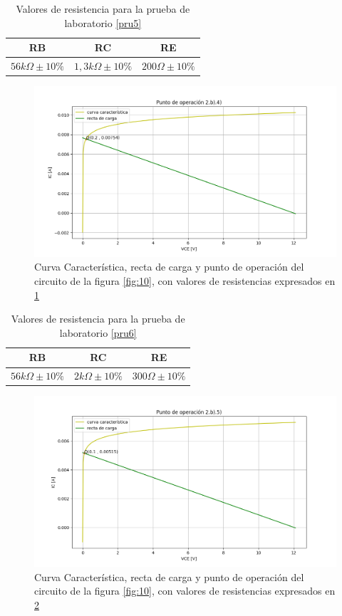 \documentclass[10pt, a4paper]{article}
\begin{document}
    \newpage

    \begin{table}[h!]
        \centering
        \caption{Valores de resistencia para la prueba de laboratorio \ref{pru5}}
        \label{tab:2b4}
        \begin{tabular}{|c|c|c|} \hline
            RB & RC & RE \\ \hline
            $56k\Omega \pm 10\%$ & $1,3k\Omega \pm 10\%$ & $200\Omega \pm 10\%$ \\ \hline
        \end{tabular}
    \end{table}

    \begin{figure}[h!]
        \centering
        \includegraphics[height=5cm\textwidth]{2b4.png}
        \caption{Curva Característica, recta de carga y punto de operación del circuito de la figura \ref{fig:10}, con valores de resistencias expresados en \ref{tab:2b4}}
        \label{fig:2b4}
    \end{figure}

    \begin{table}[h!]
        \centering
        \caption{Valores de resistencia para la prueba de laboratorio \ref{pru6}}
        \label{tab:2b5}
        \begin{tabular}{|c|c|c|} \hline
            RB & RC & RE \\ \hline
            $56k\Omega \pm 10\%$ & $2k\Omega \pm 10\%$ & $300\Omega \pm 10\%$ \\ \hline
        \end{tabular}
    \end{table}

    \begin{figure}[h!]
        \centering
        \includegraphics[height=5cm\textwidth]{2b5.png}
        \caption{Curva Característica, recta de carga y punto de operación del circuito de la figura \ref{fig:10}, con valores de resistencias expresados en \ref{tab:2b5}}
        \label{fig:2b5}
    \end{figure}
\end{document}
